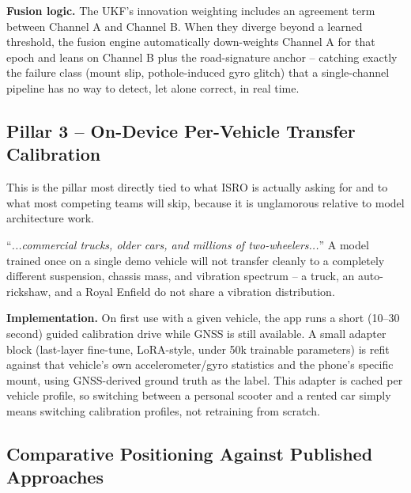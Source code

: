 \documentclass[10.5pt]{article}
\begin{document}
\textbf{Fusion logic.} The UKF's innovation weighting includes an agreement term between Channel A and Channel B. When they diverge beyond a learned threshold, the fusion engine automatically down-weights Channel A for that epoch and leans on Channel B plus the road-signature anchor -- catching exactly the failure class (mount slip, pothole-induced gyro glitch) that a single-channel pipeline has no way to detect, let alone correct, in real time.

\subsection{Pillar 3 -- On-Device Per-Vehicle Transfer Calibration}
This is the pillar most directly tied to what ISRO is actually asking for and to what most competing teams will skip, because it is unglamorous relative to model architecture work.

\begin{keyinsight}
``\emph{...commercial trucks, older cars, and millions of two-wheelers...}'' A model trained once on a single demo vehicle will not transfer cleanly to a completely different suspension, chassis mass, and vibration spectrum -- a truck, an auto-rickshaw, and a Royal Enfield do not share a vibration distribution.
\end{keyinsight}

\textbf{Implementation.} On first use with a given vehicle, the app runs a short (10--30 second) guided calibration drive while GNSS is still available. A small adapter block (last-layer fine-tune, LoRA-style, under 50k trainable parameters) is refit against that vehicle's own accelerometer/gyro statistics and the phone's specific mount, using GNSS-derived ground truth as the label. This adapter is cached per vehicle profile, so switching between a personal scooter and a rented car simply means switching calibration profiles, not retraining from scratch.

\subsection{Comparative Positioning Against Published Approaches}
\end{document}

